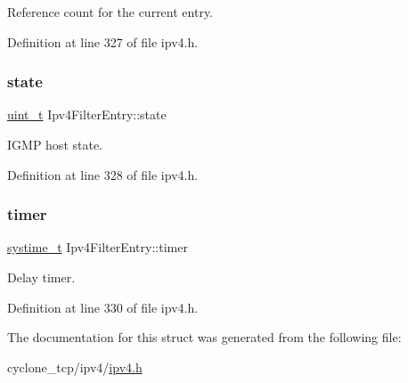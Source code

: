Reference count for the current entry. 



Definition at line 327 of file ipv4.\+h.

\mbox{\label{structIpv4FilterEntry_abc0b2be8dd44f499324d119243959111}} 
\subsubsection{\texorpdfstring{state}{state}}
{\footnotesize\ttfamily \hyperlink{compiler__port_8h_a12a1e9b3ce141648783a82445d02b58d}{uint\+\_\+t} Ipv4\+Filter\+Entry\+::state}



I\+G\+MP host state. 



Definition at line 328 of file ipv4.\+h.

\mbox{\label{structIpv4FilterEntry_aaa44209273e6a296c3e63b789f7441d4}} 
\subsubsection{\texorpdfstring{timer}{timer}}
{\footnotesize\ttfamily \hyperlink{compiler__port_8h_ae3e32a98d431a02106616da3071832dd}{systime\+\_\+t} Ipv4\+Filter\+Entry\+::timer}



Delay timer. 



Definition at line 330 of file ipv4.\+h.



The documentation for this struct was generated from the following file\+:\begin{DoxyCompactItemize}
\item 
cyclone\+\_\+tcp/ipv4/\hyperlink{ipv4_8h}{ipv4.\+h}\end{DoxyCompactItemize}
